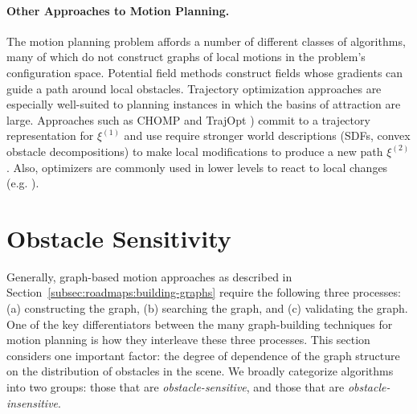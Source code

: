 
\paragraph{Other Approaches to Motion Planning.}
The motion planning problem affords a number of different classes of
algorithms,
many of which do not construct graphs of local motions in the
problem's configuration space.
Potential field methods \citep{khatib1986potentialfields}
construct fields whose gradients can guide a path around
local obstacles.
Trajectory optimization approaches are especially well-suited to
planning instances in which the basins of attraction are large.
Approaches such as CHOMP \citep{zucker2013chomp}
and TrajOpt \citep{schulman2013trajopt})
commit to a trajectory representation for $\xi^{(1)}$
and use require stronger world descriptions
(SDFs, convex obstacle decompositions)
to make local modifications
to produce a new path $\xi^{(2)}$.
Also,
optimizers are commonly used in lower levels to react to local
changes (e.g. \citep{quinlan1994modification}).

\section{Obstacle Sensitivity}
\label{sec:roadmaps:sensitivity}

Generally,
graph-based motion approaches as described
in Section~\ref{subsec:roadmaps:building-graphs}
require the following three processes:
(a) constructing the graph,
(b) searching the graph, and
(c) validating the graph.
One of the key differentiators between the many graph-building
techniques for motion planning
is how they interleave these three processes.
This section considers one important factor:
the degree of dependence of the graph structure
on the distribution of obstacles in the scene.
We broadly categorize algorithms into two groups:
those that are \emph{obstacle-sensitive},
and those that are \emph{obstacle-insensitive}.


